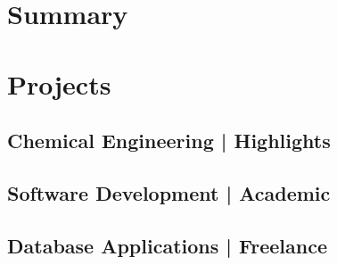 %
\newcommand{\summary}[1]{%
  {\small
  \section{Summary}
  \noindent{#1}
  }
}
\newcommand{\statementSpace}{%
  \vspace{0.3em}%
  \\
}
%
%
%
%
%
\justifying
%
%
%
%
\summary{%

}
%
%
%
%
  \vspace{.5em}%
\section{Projects}%
  \vspace{-0.3em}%
%
\subsection{Chemical Engineering | Highlights}
%

%
\subsection{Software Development | Academic}
%

%
\subsection{Database Applications | Freelance}
%

%
%
